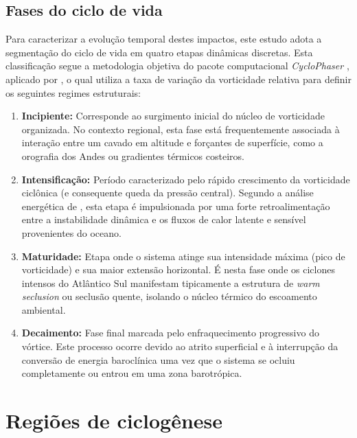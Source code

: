 \subsection{Fases do ciclo de vida}\label{subsec:mt_fases}

Para caracterizar a evolução temporal destes impactos, este estudo adota a segmentação do ciclo de vida em quatro etapas dinâmicas discretas. Esta classificação segue a metodologia objetiva do pacote computacional \textit{CycloPhaser} \citep{deSouza2025CycloPhaser}, aplicado por \citet{coutodesouza2024new}, o qual utiliza a taxa de variação da vorticidade relativa para definir os seguintes regimes estruturais:

\begin{enumerate}
    \item \textbf{Incipiente:} Corresponde ao surgimento inicial do núcleo de vorticidade organizada. No contexto regional, esta fase está frequentemente associada à interação entre um cavado em altitude e forçantes de superfície, como a orografia dos Andes ou gradientes térmicos costeiros.
    
    \item \textbf{Intensificação:} Período caracterizado pelo rápido crescimento da vorticidade ciclônica (e consequente queda da pressão central). Segundo a análise energética de \citet{coutodesouza2024thesis}, esta etapa é impulsionada por uma forte retroalimentação entre a instabilidade dinâmica e os fluxos de calor latente e sensível provenientes do oceano.
    
    \item \textbf{Maturidade:} Etapa onde o sistema atinge sua intensidade máxima (pico de vorticidade) e sua maior extensão horizontal. É nesta fase onde os ciclones intensos do Atlântico Sul manifestam tipicamente a estrutura de \textit{warm seclusion} ou seclusão quente, isolando o núcleo térmico do escoamento ambiental.
    
    \item \textbf{Decaimento:} Fase final marcada pelo enfraquecimento progressivo do vórtice. Este processo ocorre devido ao atrito superficial e à interrupção da conversão de energia baroclínica uma vez que o sistema se ocluiu completamente ou entrou em uma zona barotrópica.
\end{enumerate}

\section{Regiões de ciclogênese}\label{sec:mt_regiones}

